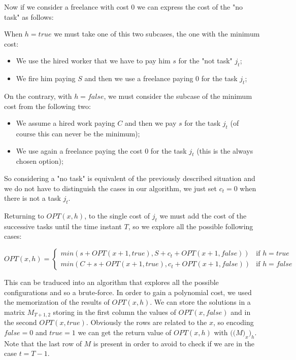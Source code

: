 \documentclass[paper=a4, fontsize=11pt]{scrartcl} %
\numberwithin{equation}{section} %
\numberwithin{figure}{section} %
\numberwithin{table}{section} %
\begin{document}
Now if we consider a freelance with cost $0$ we can express the cost of the "no task" as follows:

When $h = true$ we must take one of this two subcases, the one with the minimum cost:
\begin{itemize}
    \item We use the hired worker that we have to pay him $s$ for the "not task" $j_t$;
    \item We fire him paying $S$ and then we use a freelance paying 0 for the task $j_t$;
\end{itemize}
On the contrary, with $h = false$, we must consider the subcase of the minimum cost from the following two:
\begin{itemize}
    \item We assume a hired work paying $C$ and then we pay $s$ for the task $j_t$ (of course this can never be the minimum);
    \item We use again a freelance paying the cost 0 for the task $j_t$ (this is the always chosen option);
\end{itemize}

So considering a "no task" is equivalent of the previously described situation and we do not have to distinguish the cases in our algorithm, we just set $c_t = 0$ when there is not a task $j_t$.

Returning to $OPT(x, h)$, to the single cost of $j_t$ we must add the cost of the successive tasks until the time instant $T$, so we explore all the possible following cases:

\[
    OPT(x, h) = 
    \begin{cases}
        min(s + OPT(x+1, true), S + c_t + OPT(x+1, false)) & \text{if } h = true \\
        min(C + s + OPT(x+1, true), c_t + OPT(x+1, false)) & \text{if } h = false
    \end{cases}
\]

This can be traduced into an algorithm that explores all the possible configurations and so a brute-force. In order to gain a polynomial cost, we used the memorization of the results of $OPT(x, h)$.
We can store the solutions in a matrix $M_{T+1,2}$ storing in the first column the values of $OPT(x, false)$ and in the second $OPT(x, true)$. Obviously the rows are related to the $x$, so encoding $false = 0$ and $true = 1$ we can get the return value of $OPT(x, h)$ with $\big(\big(M\big)_x\big)_h$. Note that the last row of $M$ is present in order to avoid to check if we are in the case $t = T-1$.
\end{document}

